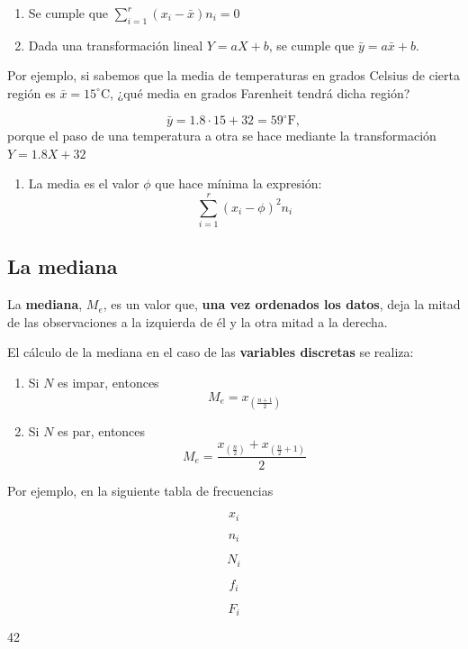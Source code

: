 \documentclass[]{book}
\providecommand{\tightlist}{%
  \setlength{\itemsep}{0pt}\setlength{\parskip}{0pt}}
\theoremstyle{definition}
\theoremstyle{definition}
\theoremstyle{definition}
\theoremstyle{remark}
\begin{document}
\begin{enumerate}
\def\labelenumi{\arabic{enumi}.}
\item
  Se cumple que \(\sum_{i=1}^r (x_i - \bar{x})n_i = 0\)
\item
  Dada una transformación lineal \(Y = aX + b\), se cumple que
  \(\bar{y} = a \bar{x} + b\).
\end{enumerate}

Por ejemplo, si sabemos que la media de temperaturas en grados Celsius
de cierta región es \(\bar{x} = 15^{\circ} \mbox{C}\), ¿qué media en
grados Farenheit tendrá dicha región?

\[\bar{y} = 1.8 \cdot 15 + 32 = 59^{\circ} \mbox{F},\] porque el paso de
una temperatura a otra se hace mediante la transformación
\(Y=1.8 X + 32\)

\begin{enumerate}
\def\labelenumi{\arabic{enumi}.}
\setcounter{enumi}{2}
\tightlist
\item
  La media es el valor \(\phi\) que hace mínima la expresión:
  \[\sum_{i=1}^r (x_i - \phi)^2 n_i\]
\end{enumerate}

\subsection{La mediana}\label{la-mediana}

La \textbf{mediana}, \(M_e\), es un valor que, \textbf{una vez ordenados
los datos}, deja la mitad de las observaciones a la izquierda de él y la
otra mitad a la derecha.

El cálculo de la mediana en el caso de las \textbf{variables discretas}
se realiza:

\begin{enumerate}
\def\labelenumi{\arabic{enumi}.}
\tightlist
\item
  Si \(N\) es impar, entonces \[M_e = x_{({\frac{n+1}{2}})}\]
\item
  Si \(N\) es par, entonces
  \[M_e = \frac{x_{({\frac{n}{2}})}+x_{({\frac{n}{2}+1})}}{2}\]
\end{enumerate}

Por ejemplo, en la siguiente tabla de frecuencias

\[ x_i \]

\[ n_i \]

\[ N_i \]

\[ f_i \]

\[ F_i \]

42
\end{document}
